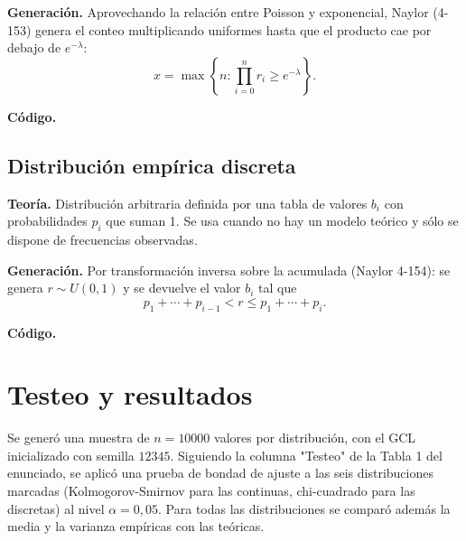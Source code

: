 \documentclass[11pt]{article}
\begin{document}
\textbf{Generaci\'on.} Aprovechando la relaci\'on entre Poisson y
exponencial, Naylor (4-153) genera el conteo multiplicando uniformes hasta
que el producto cae por debajo de $e^{-\lambda}$:
\begin{equation}
x = \max\left\{ n : \prod_{i=0}^{n} r_i \ge e^{-\lambda} \right\}.
\end{equation}

\textbf{C\'odigo.}


\subsection{Distribuci\'on emp\'irica discreta}

\textbf{Teor\'ia.} Distribuci\'on arbitraria definida por una tabla de
valores $b_i$ con probabilidades $p_i$ que suman 1. Se usa cuando no hay un
modelo te\'orico y s\'olo se dispone de frecuencias observadas.

\textbf{Generaci\'on.} Por transformaci\'on inversa sobre la acumulada
(Naylor 4-154): se genera $r \sim U(0,1)$ y se devuelve el valor $b_i$ tal
que
\begin{equation}
p_1 + \cdots + p_{i-1} < r \le p_1 + \cdots + p_i.
\end{equation}

\textbf{C\'odigo.}


\section{Testeo y resultados}

Se gener\'o una muestra de $n = 10000$ valores por distribuci\'on, con el
GCL inicializado con semilla $12345$. Siguiendo la columna "Testeo" de la
Tabla 1 del enunciado, se aplic\'o una prueba de bondad de ajuste a las seis
distribuciones marcadas (Kolmogorov-Smirnov para las continuas,
chi-cuadrado para las discretas) al nivel $\alpha = 0{,}05$. Para todas las
distribuciones se compar\'o adem\'as la media y la varianza emp\'iricas con
las te\'oricas.
\end{document}
